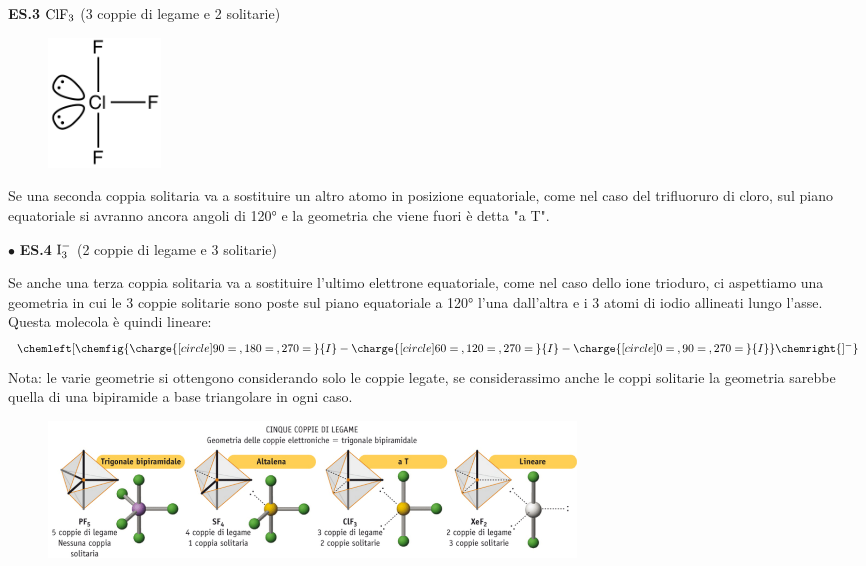 \vspace{0.2cm}\textbf{ES.3} $\rm ClF_3$ (3 coppie di legame e 2 solitarie)

\hspace{0.5cm}\begin{minipage}{0.2\textwidth}
    \begin{figure}[H]
        \includegraphics[width=3cm]{immagini/ClF_3.png}
    \end{figure}
\end{minipage} \hfill
\begin{minipage}{0.65\textwidth}
    \vspace{0.2cm}Se una seconda coppia solitaria va a sostituire un altro atomo in posizione equatoriale, come nel caso del trifluoruro di cloro, sul piano equatoriale si avranno ancora angoli di 120° e la geometria che viene fuori è detta "a T".
\end{minipage}

\vspace{0.2cm}$\bullet$ \textbf{ES.4} $\rm I_3^-$ (2 coppie di legame e 3 solitarie)

\vspace{0.2cm}Se anche una terza coppia solitaria va a sostituire l'ultimo elettrone equatoriale, come nel caso dello ione trioduro, ci aspettiamo una geometria in cui le 3 coppie solitarie sono poste sul piano equatoriale a 120° l'una dall'altra e i 3 atomi di iodio allineati lungo l'asse. Questa molecola è quindi lineare:
$$
\chemleft[ \chemfig{\charge{[circle]90=\:,180=\:,270=\:}{I}-\charge{[circle]60=\:,120=\:,270=\:}{I}-\charge{[circle]0=\:,90=\:,270=\:}{I}} \chemright{]^{-}}
$$
Nota: le varie geometrie si ottengono considerando solo le coppie legate, se considerassimo anche le coppi solitarie la geometria sarebbe quella di una bipiramide a base triangolare in ogni caso.
\begin{figure}[htp]
    \centering
    \includegraphics[width=14cm]{immagini/geometrie-5-coppie.png}
\end{figure}
